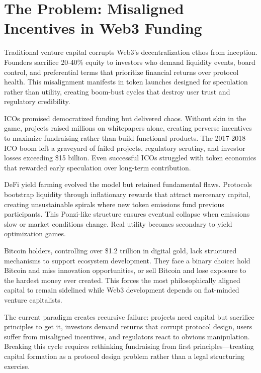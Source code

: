 \section{The Problem: Misaligned Incentives in Web3 Funding}

Traditional venture capital corrupts Web3's decentralization ethos from inception. Founders sacrifice 20-40\% equity to investors who demand liquidity events, board control, and preferential terms that prioritize financial returns over protocol health. This misalignment manifests in token launches designed for speculation rather than utility, creating boom-bust cycles that destroy user trust and regulatory credibility.

ICOs promised democratized funding but delivered chaos. Without skin in the game, projects raised millions on whitepapers alone, creating perverse incentives to maximize fundraising rather than build functional products. The 2017-2018 ICO boom left a graveyard of failed projects, regulatory scrutiny, and investor losses exceeding \$15 billion. Even successful ICOs struggled with token economics that rewarded early speculation over long-term contribution.

DeFi yield farming evolved the model but retained fundamental flaws. Protocols bootstrap liquidity through inflationary rewards that attract mercenary capital, creating unsustainable spirals where new token emissions fund previous participants. This Ponzi-like structure ensures eventual collapse when emissions slow or market conditions change. Real utility becomes secondary to yield optimization games.

Bitcoin holders, controlling over \$1.2 trillion in digital gold, lack structured mechanisms to support ecosystem development. They face a binary choice: hold Bitcoin and miss innovation opportunities, or sell Bitcoin and lose exposure to the hardest money ever created. This forces the most philosophically aligned capital to remain sidelined while Web3 development depends on fiat-minded venture capitalists.

The current paradigm creates recursive failure: projects need capital but sacrifice principles to get it, investors demand returns that corrupt protocol design, users suffer from misaligned incentives, and regulators react to obvious manipulation. Breaking this cycle requires rethinking fundraising from first principles—treating capital formation as a protocol design problem rather than a legal structuring exercise.

